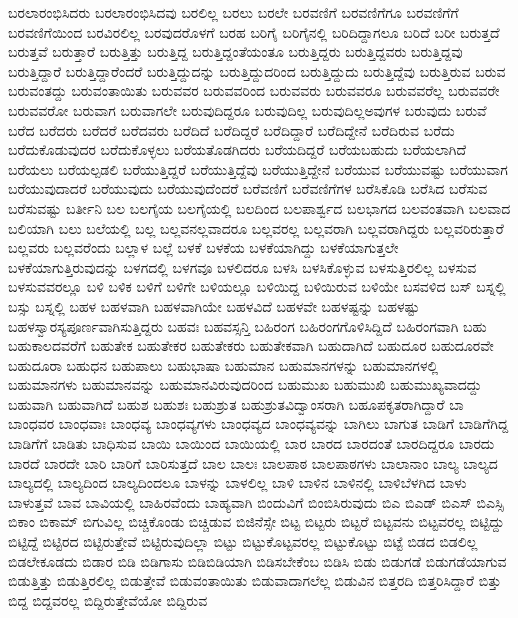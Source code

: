 {ಬರಲಾರಂಭಿಸಿದರು
ಬರಲಾರಂಭಿಸಿದವು
ಬರಲಿಲ್ಲ
ಬರಲು
ಬರಲೇ
ಬರವಣಿಗೆ
ಬರವಣಿಗೆಗೂ
ಬರವಣಿಗೆಗೆ
ಬರವಣಿಗೆಯಿಂದ
ಬರವಿರಲಿಲ್ಲ
ಬರವುದರೊಳಗೆ
ಬರಹ
ಬರಿಗೈ
ಬರಿಗೈನಲ್ಲಿ
ಬರಿದಿದ್ದಾಗಲೂ
ಬರಿದೆ
ಬರೀ
ಬರುತ್ತದೆ
ಬರುತ್ತವೆ
ಬರುತ್ತಾರೆ
ಬರುತ್ತಿತ್ತು
ಬರುತ್ತಿದ್ದ
ಬರುತ್ತಿದ್ದಂತೆಯಂತೂ
ಬರುತ್ತಿದ್ದರು
ಬರುತ್ತಿದ್ದವರು
ಬರುತ್ತಿದ್ದವು
ಬರುತ್ತಿದ್ದಾರೆ
ಬರುತ್ತಿದ್ದಾರೆಂದರೆ
ಬರುತ್ತಿದ್ದುದನ್ನು
ಬರುತ್ತಿದ್ದುದರಿಂದ
ಬರುತ್ತಿದ್ದುದು
ಬರುತ್ತಿದ್ದೆವು
ಬರುತ್ತಿರುವ
ಬರುವ
ಬರುವಂತದ್ದು
ಬರುವಂತಾಯಿತು
ಬರುವವರ
ಬರುವವರಿಂದ
ಬರುವವರು
ಬರುವವರೂ
ಬರುವವರೆಲ್ಲ
ಬರುವವರೇ
ಬರುವವರೋ
ಬರುವಾಗ
ಬರುವಾಗಲೇ
ಬರುವುದಿದ್ದರೂ
ಬರುವುದಿಲ್ಲ
ಬರುವುದಿಲ್ಲಅವುಗಳ
ಬರುವುದು
ಬರುವೆ
ಬರೆದ
ಬರೆದರು
ಬರೆದರೆ
ಬರೆದವರು
ಬರೆದಿದೆ
ಬರೆದಿದ್ದರೆ
ಬರೆದಿದ್ದಾರೆ
ಬರೆದಿದ್ದೇನೆ
ಬರೆದಿರುವ
ಬರೆದು
ಬರೆದುಕೊಡುವುದರ
ಬರೆದುಕೊಳ್ಳಲು
ಬರೆಯತೊಡಗಿದರು
ಬರೆಯದಿದ್ದರೆ
ಬರೆಯಬಹುದು
ಬರೆಯಲಾಗಿದೆ
ಬರೆಯಲು
ಬರೆಯಲ್ಪಡಲಿ
ಬರೆಯುತ್ತಿದ್ದರೆ
ಬರೆಯುತ್ತಿದ್ದೆವು
ಬರೆಯುತ್ತಿದ್ದೇನೆ
ಬರೆಯುವ
ಬರೆಯುವಷ್ಟು
ಬರೆಯುವಾಗ
ಬರೆಯುವುದಾದರೆ
ಬರೆಯುವುದು
ಬರೆಯುವುದೆಂದರೆ
ಬರೆವಣಿಗೆ
ಬರೆವಣಿಗೆಗಳ
ಬರೆಸಿಕೊಡಿ
ಬರೆಸಿದ
ಬರೆಸುವ
ಬರೆಸುವಷ್ಟು
ಬರ್ತೀನಿ
ಬಲ
ಬಲಗೈಯ
ಬಲಗೈಯಲ್ಲಿ
ಬಲದಿಂದ
ಬಲಪಾರ್ಶ್ವದ
ಬಲಭಾಗದ
ಬಲವಂತವಾಗಿ
ಬಲವಾದ
ಬಲಿಯಾಗಿ
ಬಲು
ಬಲೆಯಲ್ಲಿ
ಬಲ್ಲ
ಬಲ್ಲವನಲ್ಲವಾದರೂ
ಬಲ್ಲವರಲ್ಲ
ಬಲ್ಲವರಾಗಿ
ಬಲ್ಲವರಾಗಿದ್ದರು
ಬಲ್ಲವರಿರುತ್ತಾರೆ
ಬಲ್ಲವರು
ಬಲ್ಲವರೆಂದು
ಬಲ್ಲಾಳ
ಬಲ್ಲೆ
ಬಳಕೆ
ಬಳಕೆಯ
ಬಳಕೆಯಾಗಿದ್ದು
ಬಳಕೆಯಾಗುತ್ತಲೇ
ಬಳಕೆಯಾಗುತ್ತಿರುವುದನ್ನು
ಬಳಗದಲ್ಲಿ
ಬಳಗವೂ
ಬಳಲಿದರೂ
ಬಳಸಿ
ಬಳಸಿಕೊಳ್ಳುವ
ಬಳಸುತ್ತಿರಲಿಲ್ಲ
ಬಳಸುವ
ಬಳಸುವವರಲ್ಲೂ
ಬಳಿ
ಬಳಿಕ
ಬಳಿಗೆ
ಬಳಿಗೇ
ಬಳಿಯಲ್ಲೂ
ಬಳಿಯಿದ್ದ
ಬಳಿಯಿರುವ
ಬಳಿಯೇ
ಬಸವಳಿದ
ಬಸ್
ಬಸ್ನಲ್ಲಿ
ಬಸ್ಸು
ಬಸ್ನಲ್ಲಿ
ಬಹಳ
ಬಹಳವಾಗಿ
ಬಹಳವಾಗಿಯೇ
ಬಹಳವಿದೆ
ಬಹಳವೇ
ಬಹಳಷ್ಟನ್ನು
ಬಹಳಷ್ಟು
ಬಹಳಸ್ವಾರಸ್ಯಪೂರ್ಣವಾಗಿಸುತ್ತಿದ್ದರು
ಬಹವಃ
ಬಹವಸ್ಸನ್ತಿ
ಬಹಿರಂಗ
ಬಹಿರಂಗಗೊಳಿಸಿದ್ದಿದೆ
ಬಹಿರಂಗವಾಗಿ
ಬಹು
ಬಹುಕಾಲದವರೆಗೆ
ಬಹುತೇಕ
ಬಹುತೇಕರ
ಬಹುತೇಕರು
ಬಹುತೇಕವಾಗಿ
ಬಹುದಾಗಿದೆ
ಬಹುದೂರ
ಬಹುದೂರವೇ
ಬಹುದೂರಾ
ಬಹುಧನ
ಬಹುಪಾಲು
ಬಹುಭಾಷಾ
ಬಹುಮಾನ
ಬಹುಮಾನಗಳನ್ನು
ಬಹುಮಾನಗಳಲ್ಲಿ
ಬಹುಮಾನಗಳು
ಬಹುಮಾನವನ್ನು
ಬಹುಮಾನವಿರುವುದರಿಂದ
ಬಹುಮುಖ
ಬಹುಮುಖಿ
ಬಹುಮುಖ್ಯವಾದದ್ದು
ಬಹುವಾಗಿ
ಬಹುವಾಗಿದೆ
ಬಹುಶ
ಬಹುಶಃ
ಬಹುಶ್ರುತ
ಬಹುಶ್ರುತವಿದ್ವಾಂಸರಾಗಿ
ಬಹೂಪಕೃತರಾಗಿದ್ದಾರೆ
ಬಾ
ಬಾಂಧವರ
ಬಾಂಧವಾಃ
ಬಾಂಧವ್ಯ
ಬಾಂಧವ್ಯಗಳು
ಬಾಂಧವ್ಯದ
ಬಾಂಧವ್ಯವನ್ನು
ಬಾಗಿಲು
ಬಾಗುತ
ಬಾಡಿಗೆ
ಬಾಡಿಗೆಗಿದ್ದ
ಬಾಡಿಗೆಗೆ
ಬಾಡಿತು
ಬಾಧಿಸುವ
ಬಾಯಿ
ಬಾಯಿಂದ
ಬಾಯಿಯಲ್ಲಿ
ಬಾರ
ಬಾರದ
ಬಾರದಂತೆ
ಬಾರದಿದ್ದರೂ
ಬಾರದು
ಬಾರದೆ
ಬಾರದೇ
ಬಾರಿ
ಬಾರಿಗೆ
ಬಾರಿಸುತ್ತದೆ
ಬಾಲ
ಬಾಲಃ
ಬಾಲಪಾಠ
ಬಾಲಪಾಠಗಳು
ಬಾಲಾನಾಂ
ಬಾಲ್ಯ
ಬಾಲ್ಯದ
ಬಾಲ್ಯದಲ್ಲಿ
ಬಾಲ್ಯದಿಂದ
ಬಾಲ್ಯದಿಂದಲೂ
ಬಾಳನ್ನು
ಬಾಳಲಿಲ್ಲ
ಬಾಳಿ
ಬಾಳಿನ
ಬಾಳಿನಲ್ಲಿ
ಬಾಳಿಬೆಳಗಿದ
ಬಾಳು
ಬಾಳುತ್ತವೆ
ಬಾವ
ಬಾವಿಯಲ್ಲಿ
ಬಾಹಿರವೆಂದು
ಬಾಹ್ಯವಾಗಿ
ಬಿಂದುವಿಗೆ
ಬಿಂಬಿಸಿರುವುದು
ಬಿಎ
ಬಿಎಡ್
ಬಿಎಸ್
ಬಿಎಸ್ಸಿ
ಬಿಕಾಂ
ಬಿಕಾಮ್
ಬಿಗುವಿಲ್ಲ
ಬಿಚ್ಚಿಕೊಂಡು
ಬಿಚ್ಚಿಡುವ
ಬಿಜಿನೆಸ್ಸೇ
ಬಿಟ್ಟ
ಬಿಟ್ಟರು
ಬಿಟ್ಟರೆ
ಬಿಟ್ಟವನು
ಬಿಟ್ಟವರಲ್ಲ
ಬಿಟ್ಟಿದ್ದು
ಬಿಟ್ಟಿದ್ದೆ
ಬಿಟ್ಟಿರದ
ಬಿಟ್ಟಿರುತ್ತೇವೆ
ಬಿಟ್ಟಿರುವುದಿಲ್ಲಾ
ಬಿಟ್ಟು
ಬಿಟ್ಟುಕೊಟ್ಟವರಲ್ಲ
ಬಿಟ್ಟುಕೊಟ್ಟು
ಬಿಟ್ಟೆ
ಬಿಡದ
ಬಿಡಲಿಲ್ಲ
ಬಿಡಲೇಕೂಡದು
ಬಿಡಾರ
ಬಿಡಿ
ಬಿಡಿಗಾಸು
ಬಿಡಿಬಿಡಿಯಾಗಿ
ಬಿಡಿಸಬೇಕೆಂಬ
ಬಿಡಿಸಿ
ಬಿಡು
ಬಿಡುಗಡೆ
ಬಿಡುಗಡೆಯಾಗುವ
ಬಿಡುತ್ತಿತ್ತು
ಬಿಡುತ್ತಿರಲಿಲ್ಲ
ಬಿಡುತ್ತೇವೆ
ಬಿಡುವಂತಾಯಿತು
ಬಿಡುವಾದಾಗಲೆಲ್ಲ
ಬಿಡುವಿನ
ಬಿತ್ತರದಿ
ಬಿತ್ತರಿಸಿದ್ದಾರೆ
ಬಿತ್ತು
ಬಿದ್ದ
ಬಿದ್ದವರಲ್ಲ
ಬಿದ್ದಿರುತ್ತೇವೆಯೋ
ಬಿದ್ದಿರುವ
}
